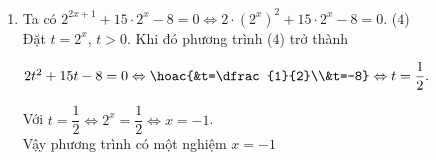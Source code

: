 \begin{ex}
{\begin{enumerate}
			Với $t=\dfrac{1}{4} \Leftrightarrow 2^x=\dfrac{1}{4}\Leftrightarrow  x=-2$.\\
			Vậy phương trình có  hai nghiệm $x=2$, $x=-2$.
			\item  Ta có $2^{2x+1}+15\cdot 2^x-8=0 \Leftrightarrow 2\cdot \left(2^x\right)^2+15\cdot 2^x-8=0$. \qquad ($4$)\\
			Đặt $t=2^x$, $t>0$. Khi đó phương trình  ($4$) trở thành
			\begin{center}
				$2t^2+15t-8=0 \Leftrightarrow \hoac{&t=\dfrac{1}{2}\\&t=-8}\Leftrightarrow t=\dfrac{1}{2}.$ 
			\end{center}
			Với $t=\dfrac{1}{2} \Leftrightarrow 2^x=\dfrac{1}{2}\Leftrightarrow  x=-1$.\\
			Vậy phương trình có một  nghiệm $x=-1$
		\end{enumerate}
	} 
\end{ex}

